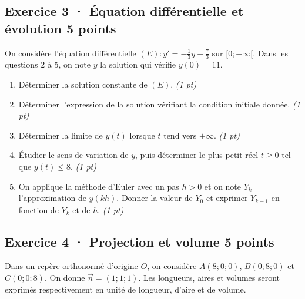 \clearpage{}\par

\subsection*{Exercice 3 · Équation différentielle et évolution \hfill 5 points}On considère l'équation différentielle $(E):y'=-\frac1{3}y+\frac{7}{3}$ sur $[0;+\infty[$. Dans les questions 2 à 5, on note $y$ la solution qui vérifie $y(0)=11$.

\begin{enumerate}

\item Déterminer la solution constante de $(E)$. \hfill\textit{(1 pt)}

\item Déterminer l'expression de la solution vérifiant la condition initiale donnée. \hfill\textit{(1 pt)}

\item Déterminer la limite de $y(t)$ lorsque $t$ tend vers $+\infty$. \hfill\textit{(1 pt)}

\item Étudier le sens de variation de $y$, puis déterminer le plus petit réel $t\ge0$ tel que $y(t)\le8$. \hfill\textit{(1 pt)}

\item On applique la méthode d'Euler avec un pas $h>0$ et on note $Y_k$ l'approximation de $y(kh)$. Donner la valeur de $Y_0$ et exprimer $Y_{k+1}$ en fonction de $Y_k$ et de $h$. \hfill\textit{(1 pt)}

\end{enumerate}

\subsection*{Exercice 4 · Projection et volume \hfill 5 points}Dans un repère orthonormé d'origine $O$, on considère $A(8;0;0)$, $B(0;8;0)$ et $C(0;0;8)$. On donne $\vec n=(1;1;1)$. Les longueurs, aires et volumes seront exprimés respectivement en unité de longueur, d'aire et de volume.


